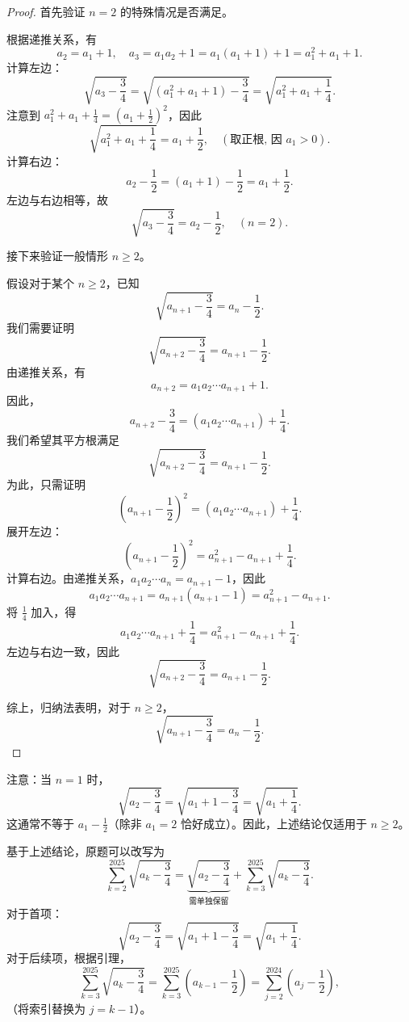 \documentclass[12pt, a4paper]{article}
\theoremstyle{definition}
\theoremstyle{remark}
\begin{document}
\begin{proof}

\noindent 首先验证 $n=2$ 的特殊情况是否满足。

\noindent 根据递推关系，有
$$
a_2=a_1+1, \quad a_3=a_1 a_2+1=a_1\left(a_1+1\right)+1=a_1^2+a_1+1.
$$
计算左边：
$$
\sqrt{a_3-\frac{3}{4}}=\sqrt{\left(a_1^2+a_1+1\right)-\frac{3}{4}}=\sqrt{a_1^2+a_1+\frac{1}{4}}.
$$
注意到 $a_1^2+a_1+\frac{1}{4}=\left(a_1+\frac{1}{2}\right)^2$，因此
$$
\sqrt{a_1^2+a_1+\frac{1}{4}}=a_1+\frac{1}{2}, \quad (\text{取正根, 因 } a_1>0).
$$
计算右边：
$$
a_2-\frac{1}{2}=\left(a_1+1\right)-\frac{1}{2}=a_1+\frac{1}{2}.
$$
左边与右边相等，故
$$
\sqrt{a_3-\frac{3}{4}}=a_2-\frac{1}{2}, \quad (n=2).
$$

\noindent 接下来验证一般情形 $n \geq 2$。

\noindent 假设对于某个 $n \geq 2$，已知
$$
\sqrt{a_{n+1}-\frac{3}{4}}=a_n-\frac{1}{2}.
$$
我们需要证明
$$
\sqrt{a_{n+2}-\frac{3}{4}}=a_{n+1}-\frac{1}{2}.
$$
由递推关系，有
$$
a_{n+2}=a_1 a_2 \cdots a_{n+1}+1.
$$
因此，
$$
a_{n+2}-\frac{3}{4}=\left(a_1 a_2 \cdots a_{n+1}\right)+\frac{1}{4}.
$$
我们希望其平方根满足
$$
\sqrt{a_{n+2}-\frac{3}{4}}=a_{n+1}-\frac{1}{2}.
$$
为此，只需证明
$$
\left(a_{n+1}-\frac{1}{2}\right)^2=\left(a_1 a_2 \cdots a_{n+1}\right)+\frac{1}{4}.
$$
展开左边：
$$
\left(a_{n+1}-\frac{1}{2}\right)^2=a_{n+1}^2-a_{n+1}+\frac{1}{4}.
$$
计算右边。由递推关系，$a_1 a_2 \cdots a_n = a_{n+1}-1$，因此
$$
a_1 a_2 \cdots a_{n+1}=a_{n+1}\left(a_{n+1}-1\right)=a_{n+1}^2-a_{n+1}.
$$
将 $\frac{1}{4}$ 加入，得
$$
a_1 a_2 \cdots a_{n+1}+\frac{1}{4}=a_{n+1}^2-a_{n+1}+\frac{1}{4}.
$$
左边与右边一致，因此
$$
\sqrt{a_{n+2}-\frac{3}{4}}=a_{n+1}-\frac{1}{2}.
$$

\noindent 综上，归纳法表明，对于 $n \geq 2$，
$$
\sqrt{a_{n+1}-\frac{3}{4}} = a_n-\frac{1}{2}.
$$
\end{proof}

\noindent 注意：当 $n=1$ 时，
$$
\sqrt{a_2-\frac{3}{4}}=\sqrt{a_1+1-\frac{3}{4}}=\sqrt{a_1+\frac{1}{4}}.
$$
这通常不等于 $a_1-\frac{1}{2}$（除非 $a_1=2$ 恰好成立）。因此，上述结论仅适用于 $n \geq 2$。

\noindent 基于上述结论，原题可以改写为
$$
\sum_{k=2}^{2025} \sqrt{a_k-\frac{3}{4}}=\underbrace{\sqrt{a_2-\frac{3}{4}}}_{\text{需单独保留}}+\sum_{k=3}^{2025} \sqrt{a_k-\frac{3}{4}}.
$$
对于首项：
$$
\sqrt{a_2-\frac{3}{4}}=\sqrt{a_1+1-\frac{3}{4}}=\sqrt{a_1+\frac{1}{4}}.
$$
对于后续项，根据引理，
$$
\sum_{k=3}^{2025} \sqrt{a_k-\frac{3}{4}}=\sum_{k=3}^{2025}\left(a_{k-1}-\frac{1}{2}\right)=\sum_{j=2}^{2024}\left(a_j-\frac{1}{2}\right),
$$
（将索引替换为 $j=k-1$）。
\end{document}
